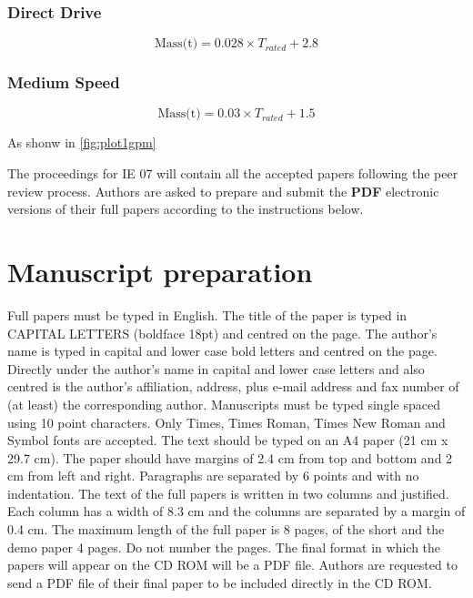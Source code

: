 \documentclass{article}\usepackage{graphicx, color}
\begin{document}
\subsubsection{Direct Drive}

\begin{equation}
  \text{Mass(t)} = 0.028 \times {T_{rated}} + 2.8
\end{equation}


\subsubsection{Medium Speed}

\begin{equation}
  \text{Mass(t)} = 0.03 \times {T_{rated}} + 1.5
\end{equation}

As shonw in \autoref{fig:plot1gpm}

The proceedings for IE 07 will contain all the accepted
papers following the peer review process. Authors are
asked to prepare and submit the {\bf PDF} electronic versions
of their full papers according to the instructions below.

\section{Manuscript preparation}
Full papers must be typed in English. The title of the
paper is typed in CAPITAL LETTERS (boldface 18pt)
and centred on the page. The author's name is typed in
capital and lower case bold letters and centred on the
page. Directly under the author's name in capital and
lower case letters and also centred is the author's
affiliation, address, plus e-mail address and fax number of
(at least) the corresponding author. Manuscripts must be
typed single spaced using 10 point characters. Only
Times, Times Roman, Times New Roman and Symbol
fonts are accepted. The text should be typed on an A4
paper (21 cm x 29.7 cm). The paper should have margins
of 2.4 cm from top and bottom and 2 cm from left and
right. Paragraphs are separated by 6 points and with no
indentation. The text of the full papers is written in two
columns and justified. Each column has a width of 8.3 cm
and the columns are separated by a margin of 0.4 cm. The
maximum length of the full paper is 8 pages, of the short
and the demo paper 4 pages. Do not number the pages.
The final format in which the papers will appear on the
CD ROM will be a PDF file. Authors are requested to send
a PDF file of their final paper to be included directly
in the CD ROM.
\end{document}
